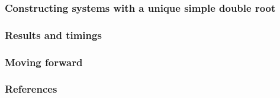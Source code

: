 \documentclass{beamer}
\begin{document}
\begin{frame}
\frametitle{Constructing systems with a unique simple double root}

\end{frame}

\begin{frame}
\frametitle{Results and timings}

\end{frame}


\begin{frame}
\frametitle{Moving forward}

\end{frame}

\begin{frame}
\frametitle{References}

\end{frame}
\end{document}
